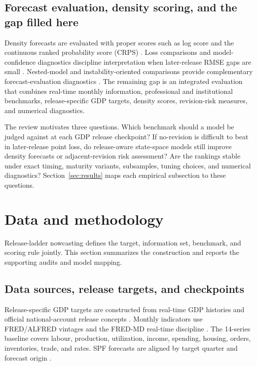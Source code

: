 \documentclass[12pt]{article}
\begin{document}
\subsection{Forecast evaluation, density scoring, and the gap filled here}

Density forecasts are evaluated with proper scores such as log score and the continuous ranked probability score (CRPS) \citep{gneitingraftery2007,gneiting2007}. Loss comparisons and model-confidence diagnostics discipline interpretation when later-release RMSE gaps are small \citep{dieboldmariano1995,giacominiwhite2006,hansen2011}. Nested-model and instability-oriented comparisons provide complementary forecast-evaluation diagnostics \citep{clarkwest2007,giacominirossi2010}. The remaining gap is an integrated evaluation that combines real-time monthly information, professional and institutional benchmarks, release-specific GDP targets, density scores, revision-risk measures, and numerical diagnostics.

The review motivates three questions. Which benchmark should a model be judged against at each GDP release checkpoint? If no-revision is difficult to beat in later-release point loss, do release-aware state-space models still improve density forecasts or adjacent-revision risk assessment? Are the rankings stable under exact timing, maturity variants, subsamples, tuning choices, and numerical diagnostics? Section~\ref{sec:results} maps each empirical subsection to these questions.


\section{Data and methodology}
\label{sec:data_methodology}

Release-ladder nowcasting defines the target, information set, benchmark, and scoring rule jointly. This section summarizes the construction and reports the supporting audits and model mapping.

\subsection{Data sources, release targets, and checkpoints}
\label{sec:data}

Release-specific GDP targets are constructed from real-time GDP histories and official national-account release concepts \citep{landefeld2008,beaNIPA2026,philadelphiaRTDSM2026}. Monthly indicators use FRED/ALFRED vintages and the FRED-MD real-time discipline \citep{fred2026,alfred2026,mccrackenng2016}. The 14-series baseline covers labour, production, utilization, income, spending, housing, orders, inventories, trade, and rates. SPF forecasts are aligned by target quarter and forecast origin \citep{spf2026}.
\end{document}
